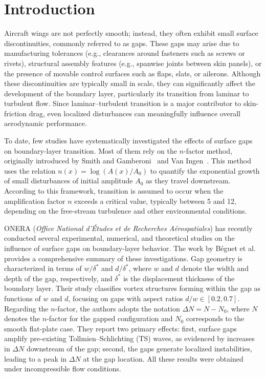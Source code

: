 \documentclass[../main.tex]{subfiles}
\begin{document}
\section{Introduction}

Aircraft wings are not perfectly smooth; instead, they often exhibit small surface discontinuities, commonly referred to as gaps. These gaps may arise due to manufacturing tolerances (e.g., clearances around fasteners such as screws or rivets), structural assembly features (e.g., spanwise joints between skin panels), or the presence of movable control surfaces such as flaps, slats, or ailerons. Although these discontinuities are typically small in scale, they can significantly affect the development of the boundary layer, particularly its transition from laminar to turbulent flow. Since laminar--turbulent transition is a major contributor to skin-friction drag, even localized disturbances can meaningfully influence overall aerodynamic performance.

To date, few studies have systematically investigated the effects of surface gaps on boundary-layer transition. Most of them rely on the $n$-factor method, originally introduced by Smith and Gamberoni~\cite{smithgamberoni} and Van Ingen~\cite{vanIngen1956}. This method uses the relation $n(x) = \log(A(x)/A_0)$ to quantify the exponential growth of small disturbances of initial amplitude $A_0$ as they travel downstream. According to this framework, transition is assumed to occur when the amplification factor $n$ exceeds a critical value, typically between 5 and 12, depending on the free-stream turbulence and other environmental conditions.

ONERA (\emph{Office National d'Études et de Recherches Aérospatiales}) has recently conducted several experimental, numerical, and theoretical studies on the influence of surface gaps on boundary-layer behavior. The work by B\'eguet et al.~\cite{beguetONERA} provides a comprehensive summary of these investigations. Gap geometry is characterized in terms of $w/\delta^*$ and $d/\delta^*$, where $w$ and $d$ denote the width and depth of the gap, respectively, and $\delta^*$ is the displacement thickness of the boundary layer. Their study classifies vortex structures forming within the gap as functions of $w$ and $d$, focusing on gaps with aspect ratios $d/w \in [0.2, 0.7]$. Regarding the $n$-factor, the authors adopts the notation $\Delta N = N - N_0$, where $N$ denotes the $n$-factor for the gapped configuration and $N_0$ corresponds to the smooth flat-plate case. They report two primary effects: first, surface gaps amplify pre-existing Tollmien--Schlichting (TS) waves, as evidenced by increases in $\Delta N$ downstream of the gap; second, the gaps generate localized instabilities, leading to a peak in $\Delta N$ at the gap location. All these results were obtained under incompressible flow conditions.
\end{document}
